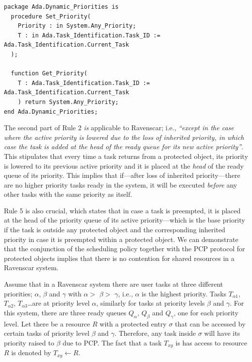 \begin{minipage}{\listingwidth}
\begin{lstlisting}[label=ada_dynamic_priorities, caption=The
    \texttt{Ada.Dynamic\_Priorities} package specification]
package Ada.Dynamic_Priorities is
  procedure Set_Priority(
    Priority : in System.Any_Priority;
    T : in Ada.Task_Identification.Task_ID := Ada.Task_Identification.Current_Task
  );
  
  function Get_Priority(
    T : Ada.Task_Identification.Task_ID := Ada.Task_Identification.Current_Task
    ) return System.Any_Priority;
end Ada.Dynamic_Priorities;
\end{lstlisting}
\end{minipage}

The second part of Rule 2 \emph{is} applicable to Ravenscar; i.e.,
\emph{``except in the case where the active priority is lowered due to
  the loss of inherited priority, in which case the task is added at
  the head of the ready queue for its new active priority''}. This
stipulates that every time a task returns from a protected object, its
priority is lowered to its previous active priority and it is placed
at the \emph{head} of the ready queue of its priority. This implies
that if---after loss of inherited priority---there are no higher
priority tasks ready in the system, it will be executed \emph{before}
any other tasks with the same priority as itself.

Rule 5 is also crucial, which states that in case a task is preempted,
it is placed at the head of the priority queue of its active
priority---which is the base priority if the task is outside any
protected object and the corresponding inherited priority in case it
is preempted within a protected object. We can demonstrate that the
conjunction of the scheduling policy together with the PCP protocol
for protected objects implies that there is no contention for shared
resources in a Ravenscar system.

\newcommand\al{$\alpha$\xspace}
\newcommand\be{$\beta$\xspace}
\newcommand\ga{$\gamma$\xspace}
\newcommand\si{$\sigma$\xspace}

Assume that in a Ravenscar system there are user tasks at three
different priorities; \al, \be and $\gamma$ with \al $>$ \be $>$ \ga,
i.e., \al is the highest priority. Tasks $T_{\alpha 1}$, $T_{\alpha
  2}$, $T_{\alpha 3}$\ldots are at priority level \al, similarly for
tasks at priority levels \be and \ga. For this system, there are three
ready queues $Q_\alpha$, $Q_\beta$ and $Q_\gamma$, one for each
priority level. Let there be a resource $R$ with a protected entry \si
that can be accessed by certain tasks of priority level \be and
\ga. Therefore, any task inside \si will have its priority raised to
\be due to PCP. The fact that a task $T_{xy}$ is has access to
resource $R$ is denoted by $T_{xy} \gets R$.

